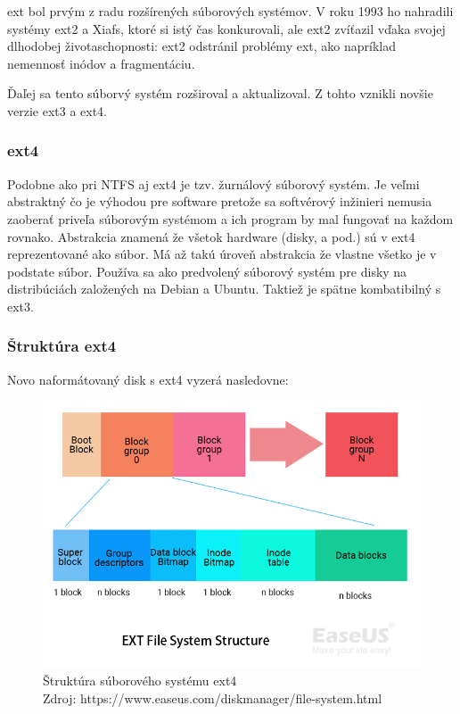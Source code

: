 \documentclass[12pt,oneside,slovak,a4paper]{article}
\begin{document}
ext bol prvým z radu rozšírených súborových systémov. V roku 1993 ho nahradili systémy ext2 a Xiafs, ktoré si istý čas konkurovali, ale ext2 zvíťazil vďaka svojej dlhodobej životaschopnosti: ext2 odstránil problémy ext, ako napríklad nemennosť inódov a fragmentáciu.

Ďaľej sa tento súborvý systém rozširoval a aktualizoval. Z tohto vznikli novšie verzie ext3 a ext4.

\subsubsection{ext4}
Podobne ako pri NTFS aj ext4 je tzv. žurnálový súborový systém. Je veľmi abstraktný čo je výhodou pre software pretože sa softvérový inžinieri nemusia zaoberať priveľa súborovým systémom a ich program by mal fungovať na každom rovnako. Abstrakcia znamená že všetok hardware (disky, a pod.) sú v ext4 reprezentované ako súbor. Má až takú úroveň abstrakcia že vlastne všetko je v podstate súbor. Používa sa ako predvolený súborový systém pre disky na distribúciách založených na Debian a Ubuntu. Taktiež je spätne kombatibilný s ext3.

\subsubsection{Štruktúra ext4}
Novo naformátovaný disk s ext4 vyzerá nasledovne:

\begin{figure}[H]
	\centering
	\captionsetup{justification=centering,margin=2cm}
	\includegraphics[scale=0.6]{./images/file_system_structure/ext-file-system-structure.png}
	\centering
	\caption{Štruktúra súborového systému ext4 \\ Zdroj: https://www.easeus.com/diskmanager/file-system.html}
\end{figure}
\end{document}
